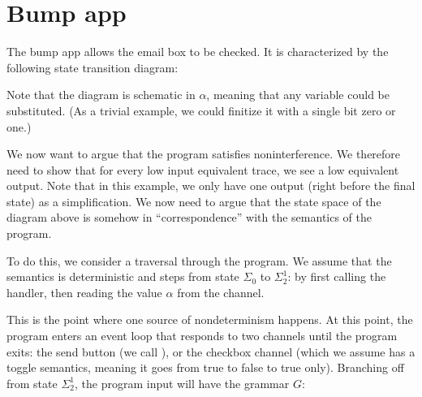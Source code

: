\documentclass[landscape]{article}
\newcommand{\code}[1]{\text{\lstinline!#1!}}
\begin{document}
\section{Bump app}

The bump app allows the email box to be checked.  It is characterized
by the following state transition diagram:


Note that the diagram is schematic in $\alpha$, meaning that any
variable could be substituted.  (As a trivial example, we could
finitize it with a single bit zero or one.)

We now want to argue that the program satisfies noninterference.  We
therefore need to show that for every low input equivalent trace, we
see a low equivalent output.  Note that in this example, we only have
one output (right before the final state) as a simplification.  We now
need to argue that the state space of the diagram above is somehow in
``correspondence'' with the semantics of the program.

To do this, we consider a traversal through the program.  We assume
that the semantics is deterministic and steps from state $\Sigma_0$ to
$\Sigma_2^1$: by first calling the \code{onC} handler, then reading
the value $\alpha$ from the \code{e} channel.

This is the point where one source of nondeterminism happens.  At this
point, the program enters an event loop that responds to two channels
until the program exits: the send button (we call \code{s}), or the
checkbox channel (which we assume has a toggle semantics, meaning it
goes from true to false to true only).  Branching off from state
$\Sigma_2^1$, the program input will have the grammar $G$:
\end{document}
